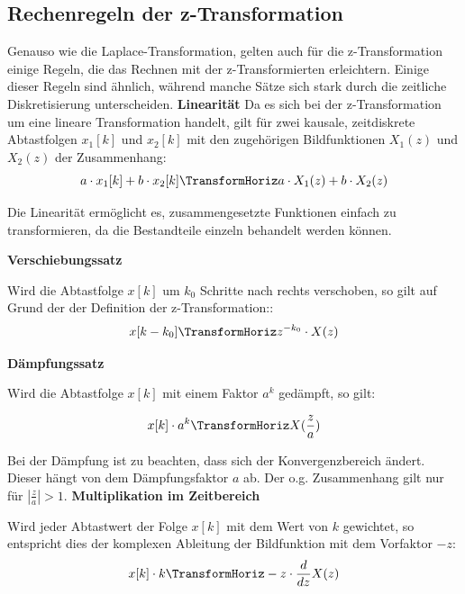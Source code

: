 \addvspace{1cm}
\subsection{Rechenregeln der z-Transformation}
\label{sec:Sätze_der_ZT}
Genauso wie die Laplace-Transformation, gelten auch für die z-Transformation einige Regeln, die das Rechnen mit der z-Transformierten erleichtern. Einige dieser Regeln sind ähnlich, während manche Sätze sich stark durch die zeitliche Diskretisierung unterscheiden.
\addvspace{1cm}
\textbf{Linearität}
Da es sich bei der z-Transformation um eine lineare Transformation handelt, gilt für zwei kausale, zeitdiskrete Abtastfolgen $x_1[k]$ und $x_2[k]$ mit den zugehörigen Bildfunktionen $X_1(z)$ und $X_2(z)$ der Zusammenhang:
\begin{equation}
    a \cdot x_1[k] + b \cdot x_2[k] \TransformHoriz a \cdot X_1(z) + b \cdot X_2(z)
\end{equation}

Die Linearität ermöglicht es, zusammengesetzte Funktionen einfach zu transformieren, da die Bestandteile einzeln behandelt werden können.

\addvspace{1cm}
\textbf{Verschiebungssatz}
\label{sec:Verschiebungssatz}

Wird die Abtastfolge $x[k]$ um $k_0$ Schritte nach rechts verschoben, so gilt auf Grund der der Definition der z-Transformation::
\begin{equation}
    x[k-k_0] \TransformHoriz z^{-k_0} \cdot X(z)
\end{equation}

\addvspace{1cm}
\textbf{Dämpfungssatz}

Wird die Abtastfolge $x[k]$ mit einem Faktor $a^k$ gedämpft, so gilt:

\begin{equation}
    x[k] \cdot a^k \TransformHoriz X(\frac{z}{a})
\end{equation}

Bei der Dämpfung ist zu beachten, dass sich der Konvergenzbereich ändert. Dieser hängt von dem Dämpfungsfaktor $a$ ab. Der o.g. Zusammenhang gilt nur für $|\frac{z}{a}| > 1$.
\addvspace{1cm}
\textbf{Multiplikation im Zeitbereich}

Wird jeder Abtastwert der Folge $x[k]$ mit dem Wert von $k$ gewichtet, so entspricht dies der komplexen Ableitung der Bildfunktion mit dem Vorfaktor $-z$:
\begin{equation}
    x[k] \cdot k \TransformHoriz -z \cdot \frac{d}{dz} X(z)
\end{equation}

